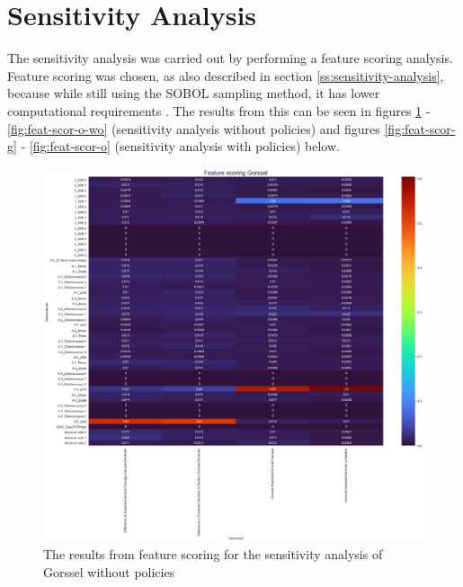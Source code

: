 \section{Sensitivity Analysis}
\label{a:sensitivity-analysis}

The sensitivity analysis was carried out by performing a feature scoring analysis. Feature scoring was chosen, as also described in section \ref{ss:sensitivity-analysis}, because while still using the SOBOL sampling method, it has lower computational requirements \cite{jaxa-rozen_tree-based_2018}. The results from this can be seen in figures \ref{fig:feat-scor-g-wo} - \ref{fig:feat-scor-o-wo} (sensitivity analysis without policies) and figures  \ref{fig:feat-scor-g} - \ref{fig:feat-scor-o} (sensitivity analysis with policies) below. 

\begin{figure}[h!]
    \centering
    \includegraphics[width=\textwidth]{report/figures/results/sa_model_Gorssel.png}
    \caption{The results from feature scoring for the sensitivity analysis of Gorssel without policies}
    \label{fig:feat-scor-g-wo}
\end{figure}

